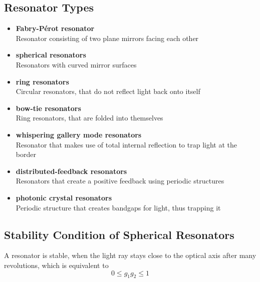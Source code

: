 \documentclass{article}
\begin{document}


\newpage


\subsection{Resonator Types}
\begin{itemize}
	\item \textbf{Fabry-Pérot resonator}\\
	Resonator consisting of two plane mirrors facing each other


	\item \textbf{spherical resonators}\\
	Resonators with curved mirror surfaces


	\item \textbf{ring resonators}\\
	Circular resonators, that do not reflect light back onto itself
	
	
	\item \textbf{bow-tie resonators}\\
	Ring resonators, that are folded into themselves
	
	
	\item \textbf{whispering gallery mode resonators}\\
	Resonator that makes use of total internal reflection to trap light at the border


	\item \textbf{distributed-feedback resonators}\\
	Resonators that create a positive feedback using periodic structures
	
	
	\item \textbf{photonic crystal resonators}\\
	Periodic structure that creates bandgaps for light, thus trapping it
\end{itemize}


\subsection{Stability Condition of Spherical Resonators}
A resonator is stable, when the light ray stays close to the optical axis after many revolutions, which is equivalent to
	\begin{equation}
		0 \leq g_1 g_2 \leq 1
	\end{equation}
\end{document}
